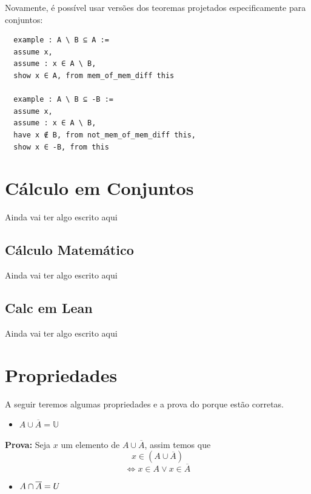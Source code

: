   Novamente, é possível usar versões dos teoremas projetados especificamente para conjuntos:

  \begin{lstlisting}
  example : A \ B ⊆ A :=
  assume x,
  assume : x ∈ A \ B,
  show x ∈ A, from mem_of_mem_diff this

  example : A \ B ⊆ -B :=
  assume x,
  assume : x ∈ A \ B,
  have x ∉ B, from not_mem_of_mem_diff this,
  show x ∈ -B, from this \end{lstlisting}


\section{Cálculo em Conjuntos}
Ainda vai ter algo escrito aqui

  \subsection{Cálculo Matemático}
  Ainda vai ter algo escrito aqui

  \subsection{Calc em Lean}
  Ainda vai ter algo escrito aqui

\section{Propriedades}
A seguir teremos algumas propriedades e a prova do porque estão corretas.
    
\begin{itemize}  
    \item $A \cup \overline A = \mathbb{U}$
\end{itemize} 

\textbf{Prova:} Seja $x$ um elemento de $A \cup \overline A$, assim temos que 
\[x \in (A \cup \overline A)\]
\[ \iff x \in A \vee x \in \overline A\]
    
\begin{itemize}
    \item $A \cap \overline A = \empty{U}$
\end{itemize} 

